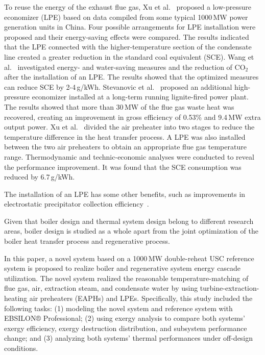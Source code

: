 \documentclass[preprint,12pt]{elsarticle}
\begin{document}
To reuse the energy of the exhaust flue gas, Xu et al.~\cite{Xu2013Techno} proposed a low-pressure economizer (LPE) based on data compiled from some typical 1000\,MW power generation units in China. Four possible arrangements for LPE installation were proposed and their energy-saving effects were compared.
The results indicated that the LPE connected with the higher-temperature section of the condensate line created a greater reduction in the standard coal equivalent (SCE). %
Wang et al.~\cite{Wang2012Application} investigated energy- and water-saving measures and the reduction of CO$_2$ after the installation of an LPE.
The results showed that the optimized measures can reduce SCE by 2-4\,g/kWh.
Stevanovic et al.~\cite{Stevanovic2014Efficiency} proposed an additional high-pressure economizer installed at a long-term running lignite-fired power plant.
The results showed that more than 30\,MW of the flue gas waste heat was recovered, creating an improvement in gross efficiency of 0.53\% and 9.4\,MW extra output power.
Xu et al.~\cite{Xu2013A} divided the air preheater into two stages to reduce the temperature difference in the heat transfer process.
A LPE was also installed between the two air preheaters to obtain an appropriate flue gas temperature range.
Thermodynamic and technic-economic analyses were conducted to reveal the performance improvement.
It was found that the SCE consumption was reduced by 6.7\,g/kWh. %

The installation of an LPE has some other benefits, such as improvements in electrostatic precipitator collection efficiency~\cite{Li2016Low}.

Given that boiler design and thermal system design belong to different research areas, boiler design is studied as a whole apart from the joint optimization of the boiler heat transfer process and regenerative process.

In this paper, a novel system based on a 1000\,MW double-reheat USC reference system is proposed to realize boiler and regenerative system energy cascade utilization. 
The novel system realized the reasonable temperature-matching of flue gas, air, extraction steam, and condensate water by using turbine-extraction-heating air preheaters (EAPHs) and LPEs.
Specifically, this study included the following tasks: (1) modeling the novel system and reference system with EBSILON® Professional; (2) using exergy analysis to compare both systems' exergy efficiency, exergy destruction distribution, and subsystem performance change; and (3) analyzing both systems' thermal performances under off-design conditions.
\end{document}
